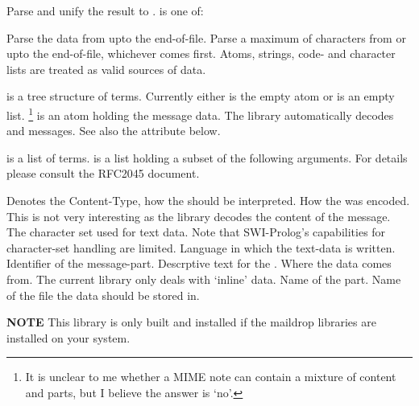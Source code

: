 \documentclass[11pt]{article}
\begin{document}
\begin{description}
Parse  and unify the result to .   is
one of:

\begin{description}
Parse the data from  upto the end-of-file.
Parse a maximum of  characters from  or
upto the end-of-file, whichever comes first.
Atoms, strings, code- and character lists are treated as valid
sources of data.
\end{description}

 is a tree structure of  terms.  Currently either  is the empty atom
or  is an empty list.%
	\footnote{It is unclear to me whether a MIME note can contain
		  a mixture of content and parts, but I believe the
		  answer is `no'.}
 is an atom holding the message data. The library
automatically decodes  and 
messages.  See also the  attribute below.

  is
a list of  terms.  is a list holding
a subset of the following arguments. For details please consult the
RFC2045 document.

\begin{description}
Denotes the Content-Type, how the  should be interpreted.
How the  was encoded.  This is not very interesting as the
library decodes the content of the message.
The character set used for text data. Note that SWI-Prolog's
capabilities for character-set handling are limited.
Language in which the text-data is written.
Identifier of the message-part.
Descrptive text for the .
Where the data comes from.  The current library only deals with
`inline' data.
Name of the part.
Name of the file the data should be stored in.
\end{description}
\end{description}

{\bf NOTE} This library is only built and installed if the maildrop
libraries are installed on your system.
\end{document}
